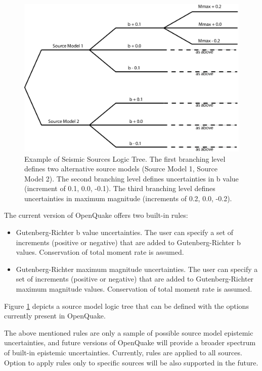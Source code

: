 \begin{figure}
\includegraphics[width=15cm]{./Figures/Part_Hazard/SourceModelLogicTree.eps}
\caption{Example of Seismic Sources Logic Tree. The first branching level defines
two alternative source models (Source Model 1, Source Model 2). The second 
branching level defines uncertainties in b value (increment of 0.1, 0.0, -0.1).
The third branching level defines uncertainties in maximum magnitude 
(increments of 0.2, 0.0, -0.2).}
\label{fig:SourceModelLogicTree}
\end{figure}
%

The current version of OpenQuake offers two built-in rules:
\begin{itemize}
\item Gutenberg-Richter b value uncertainties. The user can specify a set 
of increments (positive or negative) that are added to Gutenberg-Richter 
b values. Conservation of total moment rate is assumed.
\item Gutenberg-Richter maximum magnitude uncertainties. The user can specify
a set of increments (positive or negative) that are added to Gutenberg-Richter 
maximum magnitude values. Conservation of total moment rate is assumed.
\end{itemize}
Figure \ref{fig:SourceModelLogicTree} depicts a source model logic tree that 
can be defined with the options currently present in OpenQuake.

The above mentioned rules are only a sample of possible source model epistemic 
uncertainties, and future versions of OpenQuake will provide a broader spectrum
of built-in epistemic uncertainties. Currently, rules are applied to all 
sources. Option to apply rules only to specific sources will be also supported 
in the future.
